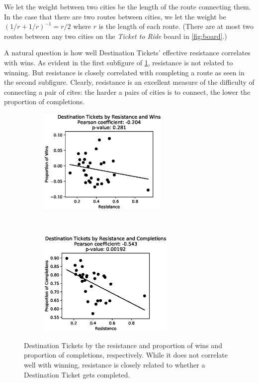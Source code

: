 We let the weight between two cities be the length
of the route connecting them.
In the case that there are two routes between cities,
we let the weight be $(1/r + 1/r)^{-1}=r/2$ where
$r$ is the length of each route.
(There are at most two routes between any two cities
on the \textit{Ticket to Ride} board 
in \cref{fig:board}.)

A natural question is how well Destination Tickets'
effective resistance correlates with wins.
As evident in the first subfigure of \cref{fig:completion},
resistance is not related to winning.
But resistance is closely correlated with completing a route
as seen in the second subfigure.
Clearly, resistance is an excellent measure
of the difficulty of connecting a pair of cites:
the harder a pairs of cities is to connect, the
lower the proportion of completions.

\begin{figure}[h]
    \centering
    \begin{subfigure}[t]{0.5\textwidth}
        \centering
        \includegraphics[height=2in]{figures/correlation1}
    \end{subfigure}%
    ~ 
    \begin{subfigure}[t]{0.5\textwidth}
        \centering
        \includegraphics[height=2in]{figures/completion}
    \end{subfigure}%
    \caption{Destination Tickets by the resistance and
    proportion of wins and proportion of completions,
    respectively.
    While it does not correlate well with
    winning, resistance is closely related to
    whether a Destination Ticket gets completed.
    }
    \label{fig:completion}
\end{figure}

